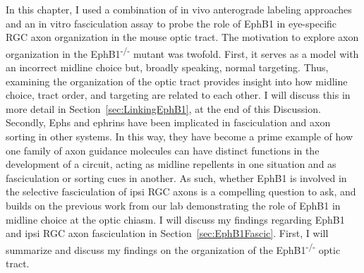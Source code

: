 In this chapter, I used a combination of in vivo anterograde labeling approaches and an in vitro fasciculation assay to probe the role of EphB1 in eye-specific RGC axon organization in the mouse optic tract.
The motivation to explore axon organization in the EphB1\textsuperscript{-/-} mutant was twofold.
First, it serves as a model with an incorrect midline choice but, broadly speaking, normal targeting.
Thus, examining the organization of the optic tract provides insight into how midline choice, tract order, and targeting are related to each other.
I will discuss this in more detail in Section~\ref{sec:LinkingEphB1}, at the end of this Discussion.
Secondly, Ephs and ephrins have been implicated in fasciculation and axon sorting in other systems.
In this way, they have become a prime example of how one family of axon guidance molecules can have distinct functions in the development of a circuit, acting as midline repellents in one situation and as fasciculation or sorting cues in another.
As such, whether EphB1 is involved in the selective fasciculation of ipsi RGC axons is a compelling question to ask, and builds on the previous work from our lab demonstrating the role of EphB1 in midline choice at the optic chiasm.
I will discuss my findings regarding EphB1 and ipsi RGC axon fasciculation in Section~\ref{sec:EphB1Fascic}.
First, I will summarize and discuss my findings on the organization of the EphB1\textsuperscript{-/-} optic tract.